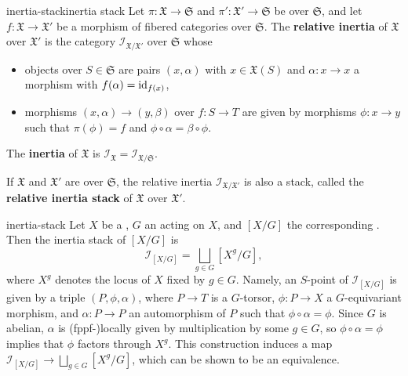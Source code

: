 \begin{topic}{inertia-stack}{inertia stack}
    Let $\pi : \mathfrak{X} \to \mathfrak{S}$ and $\pi' : \mathfrak{X}' \to \mathfrak{S}$ be  over $\mathfrak{S}$, and let $f : \mathfrak{X} \to \mathfrak{X}'$ be a morphism of fibered categories over $\mathfrak{S}$. The \textbf{relative inertia} of $\mathfrak{X}$ over $\mathfrak{X}'$ is the category $\mathcal{I}_{\mathfrak{X}/\mathfrak{X}'}$ over $\mathfrak{S}$ whose
    \begin{itemize}
        \item objects over $S \in \mathfrak{S}$ are pairs $(x, \alpha)$ with $x \in \mathfrak{X}(S)$ and $\alpha : x \to x$ a morphism with $f(\alpha) = \textup{id}_{f(x)}$,
        \item morphisms $(x, \alpha) \to (y, \beta)$ over $f : S \to T$ are given by morphisms $\phi : x \to y$ such that $\pi(\phi) = f$ and $\phi \circ \alpha = \beta \circ \phi$.
    \end{itemize}
    The \textbf{inertia} of $\mathfrak{X}$ is $\mathcal{I}_\mathfrak{X} = \mathcal{I}_{\mathfrak{X}/\mathfrak{S}}$.
    
    If $\mathfrak{X}$ and $\mathfrak{X}'$ are  over $\mathfrak{S}$, the relative inertia $\mathcal{I}_{\mathfrak{X}/\mathfrak{X}'}$ is also a stack, called the \textbf{relative inertia stack} of $\mathfrak{X}$ over $\mathfrak{X}'$.
\end{topic}

\begin{example}{inertia-stack}
    Let $X$ be a , $G$ an  acting on $X$, and $[X/G]$ the corresponding . Then the inertia stack of $[X/G]$ is
    \[ \mathcal{I}_{[X/G]} = \bigsqcup_{g \in G} [X^g / G] , \]
    where $X^g$ denotes the locus of $X$ fixed by $g \in G$. Namely, an $S$-point of $\mathcal{I}_{[X/G]}$ is given by a triple $(P, \phi, \alpha)$, where $P \to T$ is a $G$-torsor, $\phi : P \to X$ a $G$-equivariant morphism, and $\alpha : P \to P$ an automorphism of $P$ such that $\phi \circ \alpha = \phi$. Since $G$ is abelian, $\alpha$ is (fppf-)locally given by multiplication by some $g \in G$, so $\phi \circ \alpha = \phi$ implies that $\phi$ factors through $X^g$. This construction induces a map $\mathcal{I}_{[X/G]} \to \bigsqcup_{g \in G} [X^g/G]$, which can be shown to be an equivalence.
\end{example}

